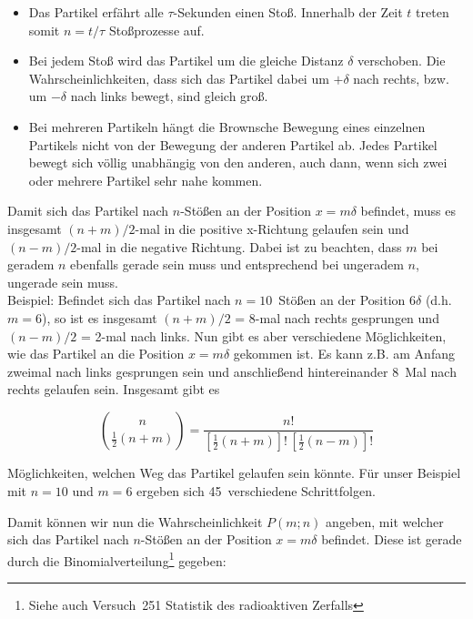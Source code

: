 \documentclass{../papanleitung}
\begin{document}
\begin{itemize}
    \item Das Partikel erf\"{a}hrt alle $\tau$-Sekunden einen Sto{\ss}.
    Innerhalb der Zeit $t$ treten somit $n=t/\tau$ Sto{\ss}prozesse
    auf.
    \item Bei jedem Sto{\ss} wird das Partikel um die gleiche Distanz
    $\delta$ verschoben. Die Wahrscheinlichkeiten, dass sich das
    Partikel dabei um $+\delta$ nach rechts, bzw. um $-\delta$ nach
    links bewegt, sind gleich gro{\ss}.
    \item Bei mehreren Partikeln h\"{a}ngt die Brownsche Bewegung
    eines einzelnen Partikels nicht von der Bewegung der anderen Partikel
    ab. Jedes Partikel bewegt sich v\"{o}llig unabh\"{a}ngig von den
    anderen, auch dann, wenn sich zwei oder mehrere Partikel sehr
    nahe kommen.
\end{itemize}



Damit sich das Partikel nach $n$-St\"{o}{\ss}en an der Position $x =
m\delta$ befindet, muss es insgesamt $(n+m)/2$-mal in die positive
x-Richtung gelaufen sein und $(n-m)/2$-mal in die negative
Richtung. Dabei ist zu beachten, dass $m$ bei geradem $n$
ebenfalls gerade sein muss und entsprechend  bei ungeradem $n$,
ungerade sein muss.
\\Beispiel: Befindet sich das Partikel nach $n = 10$~St\"{o}{\ss}en an der
Position 6$\delta$ (d.h. $m = 6$), so ist es insgesamt $(n+m)/2$ =
8-mal nach rechts gesprungen und $(n-m)/2$ = 2-mal nach links. Nun
gibt es aber verschiedene M\"{o}glichkeiten, wie das Partikel an die
Position $x = m\delta$ gekommen ist. Es kann z.B. am Anfang
zweimal nach links gesprungen sein und anschlie{\ss}end hintereinander
8~Mal nach rechts gelaufen sein. Insgesamt gibt es

\begin{equation}
   \binom{n}{\frac{1}{2}(n+m)}=\frac{n!}{[\frac{1}{2}(n+m)]!\,[\frac{1}{2}(n-m)]!}
\end{equation}

M\"{o}glichkeiten, welchen Weg das Partikel gelaufen sein k\"{o}nnte. F\"{u}r
unser Beispiel mit $n = 10$ und $m = 6$ ergeben sich
45~verschiedene Schrittfolgen.

Damit k\"{o}nnen wir nun die Wahrscheinlichkeit $P(m;n)$ angeben, mit
welcher sich das Partikel nach $n$-St\"{o}{\ss}en an der Position
$x=m\delta$ befindet. Diese ist gerade durch die
Binomialverteilung\footnote{Siehe auch Versuch~251 \glqq Statistik
des radioaktiven Zerfalls\grqq} gegeben:
\end{document}

